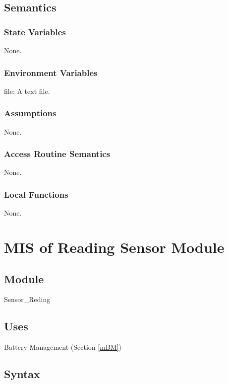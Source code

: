 \documentclass[12pt, titlepage]{article}
\begin{document}
\subsection{Semantics}

\subsubsection{State Variables}

None.

\subsubsection{Environment Variables}

file: A text file.

\subsubsection{Assumptions}
None.
\subsubsection{Access Routine Semantics}

None.

\subsubsection{Local Functions}

None.

\newpage


\section{MIS of Reading Sensor Module} \label{mSA1} 

\subsection{Module}

Sensor\_Reding

\subsection{Uses}

Battery Management (Section \ref{mBM})

\subsection{Syntax}
\end{document}

